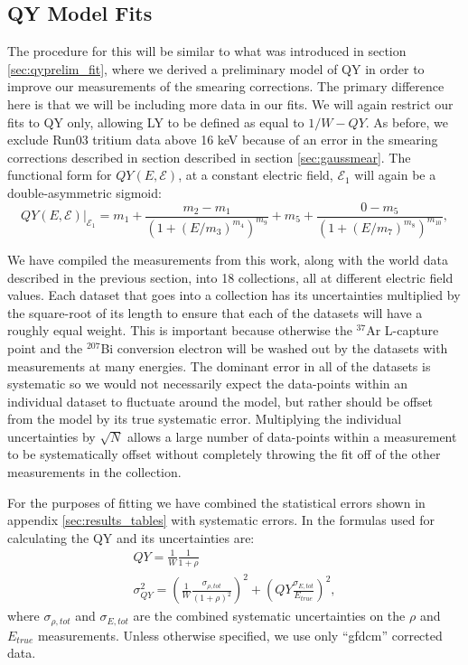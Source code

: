 \subsection{QY Model Fits}
The procedure for this will be similar to what was introduced in section \ref{sec:qyprelim_fit}, where we derived a preliminary model of QY in order to improve our measurements of the smearing corrections. The primary difference here is that we will be including more data in our fits. We will again restrict our fits to QY only, allowing LY to be defined as equal to $1/W-QY$. As before, we exclude Run03 tritium data above 16 keV because of an error in the smearing corrections described in section described in section \ref{sec:gaussmear}. The functional form for $QY(E,\mathcal{E})$, at a constant electric field, $\mathcal{E}_1$ will again be a double-asymmetric sigmoid:
\begin{equation}
QY(E,\mathcal{E})|_{\mathcal{E}_1}=m_1+\frac{m_2-m_1}{(1+(E/m_3)^{m_4})^{m_9}}+m_5+\frac{0-m_5}{(1+(E/m_7)^{m_8})^{m_{10}}},
\end{equation}

We have compiled the measurements from this work, along with the world data described in the previous section, into 18 collections, all at different electric field values. Each dataset that goes into a collection has its uncertainties multiplied by the square-root of its length to ensure that each of the datasets will have a roughly equal weight. This is important because otherwise the $^{37}$Ar L-capture point and the $^{207}$Bi conversion electron will be washed out by the datasets with measurements at many energies. The dominant error in all of the datasets is systematic so we would not necessarily expect the data-points within an individual dataset to fluctuate around the model, but rather should be offset from the model by its true systematic error. Multiplying the individual uncertainties by $\sqrt{N}$ allows a large number of data-points within a measurement to be systematically offset without completely throwing the fit off of the other measurements in the collection.

For the purposes of fitting we have combined the statistical errors shown in appendix \ref{sec:results_tables} with systematic errors. In the formulas used for calculating the QY and its uncertainties are:
\begin{equation}
\begin{split}
QY=\frac{1}{W}\frac{1}{1+\rho}\\
\sigma_{QY}^2=\left(\frac{1}{W}\frac{\sigma_{\rho,tot}}{(1+\rho)^2}\right)^2+\left(QY\frac{\sigma_{E,tot}}{E_{true}}\right)^2,
\end{split}
\end{equation}
where $\sigma_{\rho,tot}$ and $\sigma_{E,tot}$ are the combined systematic uncertainties on the $\rho$ and $E_{true}$ measurements. Unless otherwise specified, we use only ``gfdcm'' corrected data.

